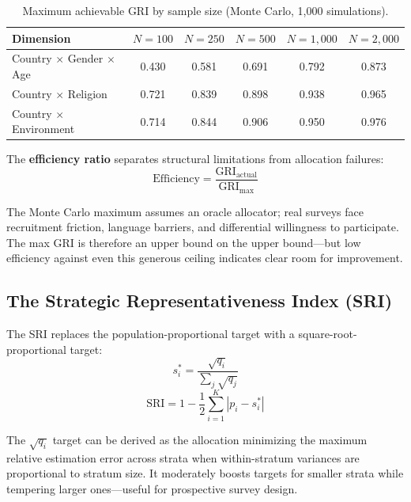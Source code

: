 \documentclass[11pt,a4paper]{article}
\begin{document}
\begin{table}[ht]
\centering
\caption{Maximum achievable GRI by sample size (Monte Carlo, 1,000 simulations).}
\label{tab:max_gri}
\begin{tabular}{@{}lccccc@{}}
\toprule
Dimension & $N=100$ & $N=250$ & $N=500$ & $N=1{,}000$ & $N=2{,}000$ \\
\midrule
Country $\times$ Gender $\times$ Age & 0.430 & 0.581 & 0.691 & 0.792 & 0.873 \\
Country $\times$ Religion & 0.721 & 0.839 & 0.898 & 0.938 & 0.965 \\
Country $\times$ Environment & 0.714 & 0.844 & 0.906 & 0.950 & 0.976 \\
\bottomrule
\end{tabular}
\end{table}

The \textbf{efficiency ratio} separates structural limitations from allocation failures:
\begin{equation}\label{eq:efficiency}
    \text{Efficiency} = \frac{\text{GRI}_{\text{actual}}}{\text{GRI}_{\text{max}}}
\end{equation}

The Monte Carlo maximum assumes an oracle allocator; real surveys face recruitment friction, language barriers, and differential willingness to participate. The max GRI is therefore an upper bound on the upper bound---but low efficiency against even this generous ceiling indicates clear room for improvement.

\subsection{The Strategic Representativeness Index (SRI)}

The SRI replaces the population-proportional target with a square-root-proportional target:
\begin{equation}\label{eq:sri_target}
    s_i^* = \frac{\sqrt{q_i}}{\sum_j \sqrt{q_j}}
\end{equation}
\begin{equation}\label{eq:sri}
    \text{SRI} = 1 - \frac{1}{2} \sum_{i=1}^{K} |p_i - s_i^*|
\end{equation}

The $\sqrt{q_i}$ target can be derived as the allocation minimizing the maximum relative estimation error across strata when within-stratum variances are proportional to stratum size. It moderately boosts targets for smaller strata while tempering larger ones---useful for prospective survey design.
\end{document}
